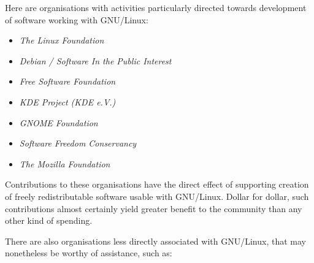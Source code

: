 \documentclass{HOWTO}
\begin{document}
Here are organisations with activities particularly directed towards
development of software working with GNU/Linux:

\begin{itemize}
\item 
\emph{The Linux Foundation} \texttt{\adhurl}
\item 
\emph{Debian / Software In the Public Interest} \texttt{\adiurl}
\item 
\emph{Free Software Foundation} \texttt{\adjurl}
 
\item 
\emph{KDE Project (KDE e.V.)} \texttt{\adkurl}
\item 
\emph{GNOME Foundation} \texttt{\adlurl}
\item 
\emph{Software Freedom Conservancy} \texttt{\admurl}
\item 
\emph{The Mozilla Foundation} \texttt{\adnurl}
\end{itemize}




Contributions to these organisations have the direct effect of
supporting creation of freely redistributable software usable with
GNU/Linux.  Dollar for dollar, such contributions almost certainly yield
greater benefit to the community than any other kind of spending.



 
There are also organisations less directly associated with GNU/Linux, that
may nonetheless be worthy of assistance, such as:
\end{document}
